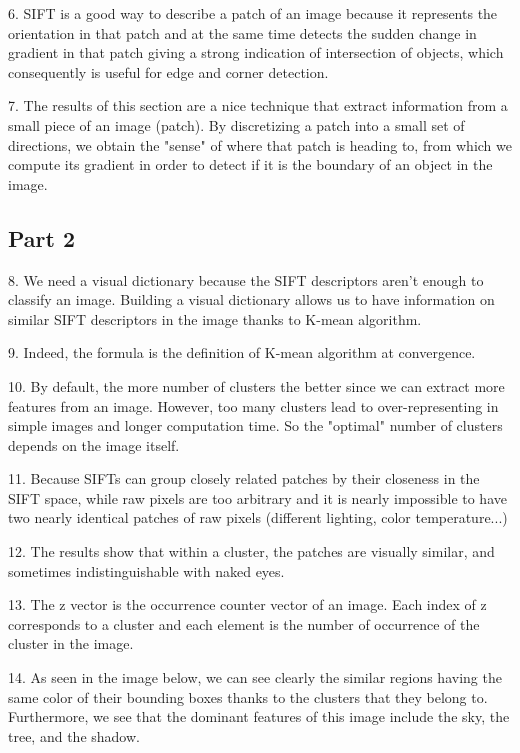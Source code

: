6. SIFT is a good way to describe a patch of an image because it represents the orientation in that patch and at the same time detects the sudden change in gradient in that patch giving a strong indication of intersection of objects, which consequently is useful for edge and corner detection.

7. The results of this section are a nice technique that extract information from a small piece of an image (patch). By discretizing a patch into a small set of directions, we obtain the "sense" of where that patch is heading to, from which we compute its gradient in order to detect if it is the boundary of an object in the image.

\subsection{Part 2}

8. We need a visual dictionary because the SIFT descriptors aren't enough to classify an image. Building a visual dictionary allows us to have information on similar SIFT descriptors in the image thanks to K-mean algorithm.

9. Indeed, the formula is the definition of K-mean algorithm at convergence.

10. By default, the more number of clusters the better since we can extract more features from an image. However, too many clusters lead to over-representing in simple images and longer computation time. So the "optimal" number of clusters depends on the image itself.

11. Because SIFTs can group closely related patches by their closeness in the SIFT space, while raw pixels are too arbitrary and it is nearly impossible to have two nearly identical patches of raw pixels (different lighting, color temperature...)

12. The results show that within a cluster, the patches are visually similar, and sometimes indistinguishable with naked eyes.

13. The z vector is the occurrence counter vector of an image. Each index of z corresponds to a cluster and each element is the number of occurrence of the cluster in the image.

14. As seen in the image below, we can see clearly the similar regions having the same color of their bounding boxes thanks to the clusters that they belong to. Furthermore, we see that the dominant features of this image include the sky, the tree, and the shadow.

